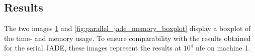 \documentclass[./\jobname.tex]{subfiles}
\begin{document}
\subsection{Results}
The two images \ref{fig:parallel_jade_time_boxplot} and \ref{fig:parallel_jade_memory_boxplot} display a boxplot of the time- and memory usage. To ensure comparability with the results obtained for the serial JADE, these images represent the results at $10^4$ \gls{nfe} on machine 1. 
\begin{figure}[h]
	\centering
	\noindent{}
	\label{fig:parallel_jade_time_boxplot}
\end{figure}
\end{document}
